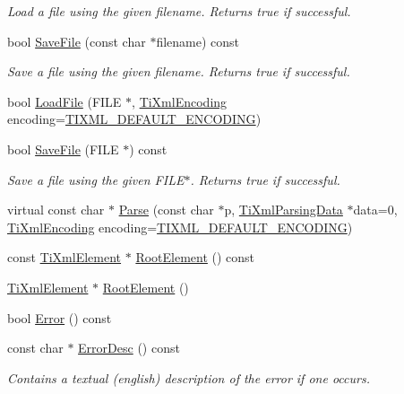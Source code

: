\begin{DoxyCompactItemize}
\begin{DoxyCompactList}\small\item\em Load a file using the given filename. Returns true if successful. \end{DoxyCompactList}\item 
bool \hyperlink{class_ti_xml_document_ae641f33784381017c44e107cc2c86b5c}{Save\+File} (const char $\ast$filename) const
\begin{DoxyCompactList}\small\item\em Save a file using the given filename. Returns true if successful. \end{DoxyCompactList}\item 
bool \hyperlink{class_ti_xml_document_a41f6fe7200864d1dca663d230caf8db6}{Load\+File} (F\+I\+LE $\ast$, \hyperlink{tinyxml_8h_a88d51847a13ee0f4b4d320d03d2c4d96}{Ti\+Xml\+Encoding} encoding=\hyperlink{tinyxml_8h_ad5b8b092878e9010d6400cb6c13d4879}{T\+I\+X\+M\+L\+\_\+\+D\+E\+F\+A\+U\+L\+T\+\_\+\+E\+N\+C\+O\+D\+I\+NG})
\item 
bool \hyperlink{class_ti_xml_document_a8f5a1022168a5767e32becec7b6f44ee}{Save\+File} (F\+I\+LE $\ast$) const
\begin{DoxyCompactList}\small\item\em Save a file using the given F\+I\+L\+E$\ast$. Returns true if successful. \end{DoxyCompactList}\item 
virtual const char $\ast$ \hyperlink{class_ti_xml_document_a789ad2f06f93d52bdb5570b2f3670289}{Parse} (const char $\ast$p, \hyperlink{class_ti_xml_parsing_data}{Ti\+Xml\+Parsing\+Data} $\ast$data=0, \hyperlink{tinyxml_8h_a88d51847a13ee0f4b4d320d03d2c4d96}{Ti\+Xml\+Encoding} encoding=\hyperlink{tinyxml_8h_ad5b8b092878e9010d6400cb6c13d4879}{T\+I\+X\+M\+L\+\_\+\+D\+E\+F\+A\+U\+L\+T\+\_\+\+E\+N\+C\+O\+D\+I\+NG})
\item 
const \hyperlink{class_ti_xml_element}{Ti\+Xml\+Element} $\ast$ \hyperlink{class_ti_xml_document_ab54e3a93279fcf0ac80f06ed9c52f04a}{Root\+Element} () const
\item 
\hyperlink{class_ti_xml_element}{Ti\+Xml\+Element} $\ast$ \hyperlink{class_ti_xml_document_a0b43e762a23f938b06651bc90b8a1013}{Root\+Element} ()
\item 
bool \hyperlink{class_ti_xml_document_a348e68faad4a3498f413c51ee9bc321a}{Error} () const
\item 
const char $\ast$ \hyperlink{class_ti_xml_document_aab511be262e84a003e3bb86f0215c8c2}{Error\+Desc} () const
\begin{DoxyCompactList}\small\item\em Contains a textual (english) description of the error if one occurs. \end{DoxyCompactList}\item 

\end{DoxyCompactItemize}
